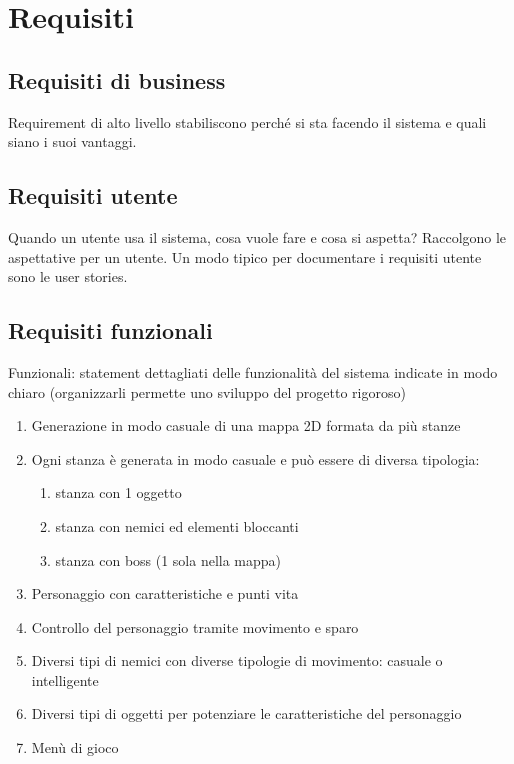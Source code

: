 \section{Requisiti}

\subsection{Requisiti di business}
Requirement di alto livello stabiliscono perché si sta facendo 
il sistema e quali siano i suoi vantaggi. 

\subsection{Requisiti utente}
Quando un utente usa il sistema, cosa vuole fare e cosa si aspetta?
Raccolgono le aspettative per un utente.
Un modo tipico per documentare i requisiti utente sono le user stories.

\subsection{Requisiti funzionali}
Funzionali: statement dettagliati delle funzionalità del sistema indicate
in modo chiaro (organizzarli permette uno sviluppo del progetto rigoroso)
\begin{enumerate}
    \item Generazione in modo casuale di una mappa 2D formata da più stanze
    \item Ogni stanza è generata in modo casuale e può essere di diversa tipologia:
        \begin{enumerate}
            \item stanza con 1 oggetto
            \item stanza con nemici ed elementi bloccanti
            \item stanza con boss (1 sola nella mappa)
        \end{enumerate}
    \item Personaggio con caratteristiche e punti vita
    \item Controllo del personaggio tramite movimento e sparo
    \item Diversi tipi di nemici con diverse tipologie di movimento: casuale o intelligente
    \item Diversi tipi di oggetti per potenziare le caratteristiche del personaggio
    \item Menù di gioco
\end{enumerate}

